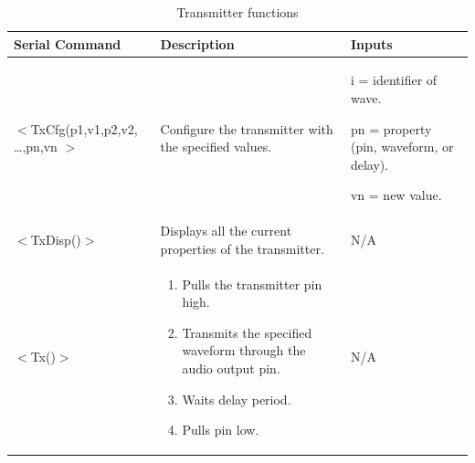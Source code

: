 \documentclass[12pt, a4paper]{article}
\begin{document}
\begin{table} [!htb]
	\caption{Transmitter functions}
	\label{tab:L_transmitterInteractions}
	\centering
	\begin{tabular}{ |m{}|m{}|m{}| } 
		\hline
		Serial Command & Description & Inputs \\ 
		\hline
		\hline
		\centering $<$TxCfg(p1,v1,p2,v2,
		…,pn,vn $>$ & Configure the transmitter with the specified values. & i = identifier of wave.
		
		pn = property (pin, waveform, or delay).
		
		vn = new value. \\
		\hline
		\centering $<$TxDisp()$>$ & Displays all the current properties of the transmitter. & N/A \\
		\hline
		\centering $<$Tx()$>$ & \begin{enumerate}
			\item Pulls the transmitter pin high.
			\item Transmits the specified waveform through the audio output pin.
			\item Waits delay period.
			\item Pulls pin low.
		\end{enumerate} & N/A \\
		\hline
	\end{tabular}
\end{table}
\end{document}
